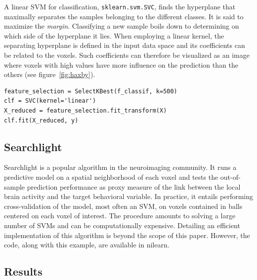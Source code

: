 \documentclass{frontiersSCNS} %
\begin{document}
A linear SVM for classification, \verb!sklearn.svm.SVC!,
finds the hyperplane that maximally
separates the samples belonging to the different classes.
It is said to maximize the \emph{margin}. Classifying a new sample boils
down to determining on which side of the hyperplane it lies. When employing a
linear kernel, the separating hyperplane is defined in the input
data space and its coefficients can be related to the voxels.
Such coefficients can therefore be visualized as an image
where voxels with high values have more influence on the prediction
than the others (see figure~\ref{fig:haxby}).

\begin{lstlisting}
feature_selection = SelectKBest(f_classif, k=500)
clf = SVC(kernel='linear')
X_reduced = feature_selection.fit_transform(X)
clf.fit(X_reduced, y)
\end{lstlisting}

\subsection{Searchlight}
\label{searchlight}

Searchlight \citep{kriegeskorte2006} is a popular algorithm in the
neuroimaging community. It runs a predictive model on a spatial
neighborhood of each voxel and tests the out-of-sample prediction
performance as proxy measure of the link between the local brain activity
and the target behavioral variable. In practice, it entails performing
cross-validation of the model, most often an SVM, on voxels contained in
balls centered on each voxel of interest. The procedure amounts to
solving a large number of SVMs and can be computationally expensive.
Detailing an efficient implementation of this algorithm is beyond the scope of this
paper. However, the code, along with this example,
are available in nilearn.

\subsection{Results}
\end{document}
